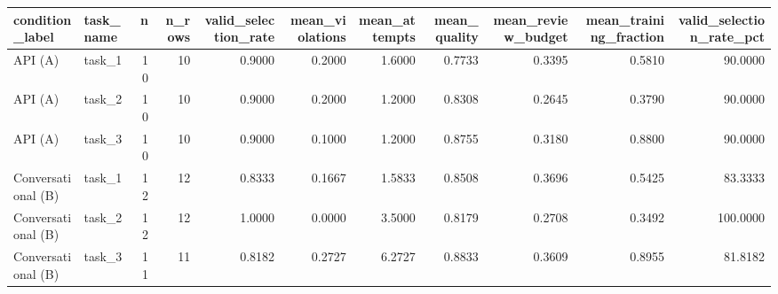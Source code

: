 \begin{tabular}{llrrrrrrrrr}
\toprule
   condition_label & task_name &  n &  n_rows &  valid_selection_rate &  mean_violations &  mean_attempts &  mean_quality &  mean_review_budget &  mean_training_fraction &  valid_selection_rate_pct \\
\midrule
           API (A) &    task_1 & 10 &      10 &                0.9000 &           0.2000 &         1.6000 &        0.7733 &              0.3395 &                  0.5810 &                   90.0000 \\
           API (A) &    task_2 & 10 &      10 &                0.9000 &           0.2000 &         1.2000 &        0.8308 &              0.2645 &                  0.3790 &                   90.0000 \\
           API (A) &    task_3 & 10 &      10 &                0.9000 &           0.1000 &         1.2000 &        0.8755 &              0.3180 &                  0.8800 &                   90.0000 \\
Conversational (B) &    task_1 & 12 &      12 &                0.8333 &           0.1667 &         1.5833 &        0.8508 &              0.3696 &                  0.5425 &                   83.3333 \\
Conversational (B) &    task_2 & 12 &      12 &                1.0000 &           0.0000 &         3.5000 &        0.8179 &              0.2708 &                  0.3492 &                  100.0000 \\
Conversational (B) &    task_3 & 11 &      11 &                0.8182 &           0.2727 &         6.2727 &        0.8833 &              0.3609 &                  0.8955 &                   81.8182 \\
\bottomrule
\end{tabular}
